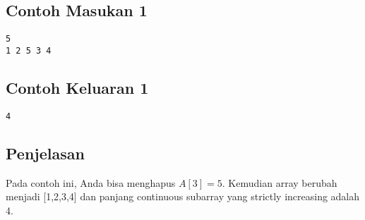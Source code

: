 \documentclass{article}
\begin{document}
\begin{multicols}{2}
\subsection*{Contoh Masukan 1}
\begin{lstlisting}
5
1 2 5 3 4
\end{lstlisting}
\columnbreak
\subsection*{Contoh Keluaran 1}
\begin{lstlisting}
4
\end{lstlisting}
\vfill
\null
\end{multicols}


\subsection*{Penjelasan}

Pada contoh ini, Anda bisa menghapus $A[3] = 5$. Kemudian array berubah menjadi [1,2,3,4] dan panjang continuous subarray yang strictly increasing adalah 4.
\end{document}

